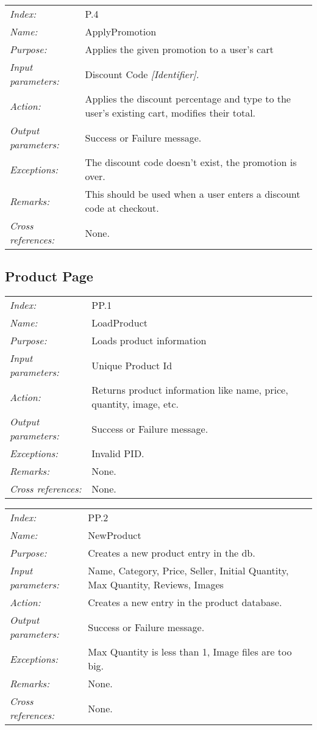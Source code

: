 \documentclass[10pt,letter]{article}
\begin{document}
\begin{tabularx}{\textwidth}{l X}
    \it{Index:} & P.4 \\
    \it{Name:} & ApplyPromotion \\
    \it{Purpose:} & Applies the given promotion to a user's cart \\
    \it{Input parameters:} & Discount Code \it{[Identifier]}.\\
    \it{Action:} & Applies the discount percentage and type to the user's existing cart, modifies their total.\\
    \it{Output parameters:} & Success or Failure message. \\
    \it{Exceptions:} & The discount code doesn't exist, the promotion is over. \\
    \it{Remarks:} & This should be used when a user enters a discount code at checkout.\\
    \it{Cross references:} & None. \\
    \hline
\end{tabularx}

\subsection{Product Page}

\begin{tabularx}{\textwidth}{l X}
    \it{Index:} & PP.1 \\
    \it{Name:} & LoadProduct \\
    \it{Purpose:} & Loads product information \\
    \it{Input parameters:} & Unique Product Id\\
    \it{Action:} & Returns product information like name, price, quantity, image, etc.\\
    \it{Output parameters:} & Success or Failure message. \\
    \it{Exceptions:} & Invalid PID. \\
    \it{Remarks:} & None. \\
    \it{Cross references:} & None. \\
    \hline
\end{tabularx}

\begin{tabularx}{\textwidth}{l X}
    \it{Index:} & PP.2 \\
    \it{Name:} & NewProduct \\
    \it{Purpose:} & Creates a new product entry in the db.\\
    \it{Input parameters:} & Name, Category, Price, Seller, Initial Quantity, Max Quantity, Reviews, Images\\
    \it{Action:} & Creates a new entry in the product database.\\
    \it{Output parameters:} & Success or Failure message. \\
    \it{Exceptions:} & Max Quantity is less than 1, Image files are too big. \\
    \it{Remarks:} & None. \\
    \it{Cross references:} & None. \\
    \hline
\end{tabularx}
\end{document}

